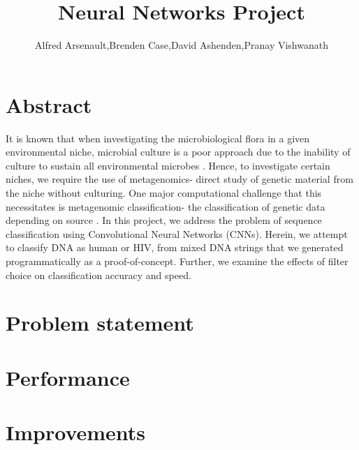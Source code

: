 \documentclass{article}
\title{Neural Networks Project}
\author{Alfred Arsenault,Brenden Case,David Ashenden,Pranay Vishwanath}
\begin{document}
\maketitle

\section{Abstract} 
It is known that when investigating the microbiological flora in a given environmental niche, microbial culture is a poor approach due to the inability of culture to sustain all environmental microbes \cite{whymeta}. Hence, to investigate certain niches, we require the use of metagenomics- direct study of genetic material from the niche without culturing. One major computational challenge that this necessitates is metagenomic classification- the classification of genetic data depending on source \cite{current}. In this project, we address the problem of sequence classification using Convolutional Neural Networks (CNNs). Herein, we attempt to classify DNA as human or HIV, from mixed DNA strings that we generated programmatically as a proof-of-concept. Further, we examine the effects of filter choice on classification accuracy and speed.\\
\pagebreak

\section{Problem statement}
\smallbreak

\section{Performance}
\smallbreak

\section{Improvements}
\smallbreak
\end{document}
